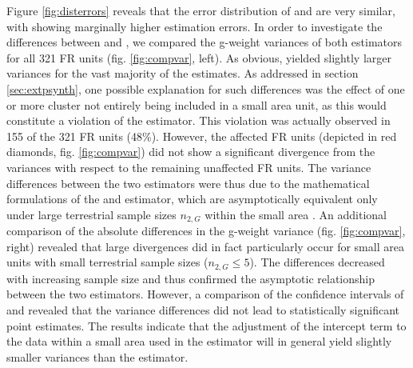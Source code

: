 Figure \ref{fig:disterrors} reveals that the error distribution of \psmall{} and \extpsynth{} are very similar, with \psmall{} showing marginally higher estimation errors. In order to investigate the differences between \psmall{} and \extpsynth{}, we compared the g-weight variances of both estimators for all 321 FR units (fig. \ref{fig:compvar}, left). As obvious, \psmall{} yielded slightly larger variances for the vast majority of the estimates. As addressed in section \ref{sec:extpsynth}, one possible explanation for such differences was the effect of one or more cluster not entirely being included in a small area unit, as this would constitute a violation of the \extpsynth{} estimator. This violation was actually observed in 155 of the 321 FR units (48\%). However, the affected FR units (depicted in red diamonds, fig. \ref{fig:compvar}) did not show a significant divergence from the \psmall{} variances with respect to the remaining unaffected FR units. The variance differences between the two estimators were thus due to the mathematical formulations of the \psmall{} and \extpsynth{} estimator, which are asymptotically equivalent only under large terrestrial sample sizes $n_{2,G}$ within the small area \citep[pp.17--18]{mandallaz2016}. An additional comparison of the absolute differences in the g-weight variance (fig. \ref{fig:compvar}, right) revealed that large divergences did in fact particularly occur for small area units with small terrestrial sample sizes ($n_{2,G} \leq 5$). The differences decreased with increasing sample size and thus confirmed the asymptotic relationship between the two estimators. However, a comparison of the confidence intervals of \psmall{} and \extpsynth{} revealed that the variance differences did not lead to statistically significant point estimates. The results indicate that the adjustment of the intercept term to the data within a small area used in the \extpsynth{} estimator will in general yield slightly smaller variances than the \psmall{} estimator.\par



